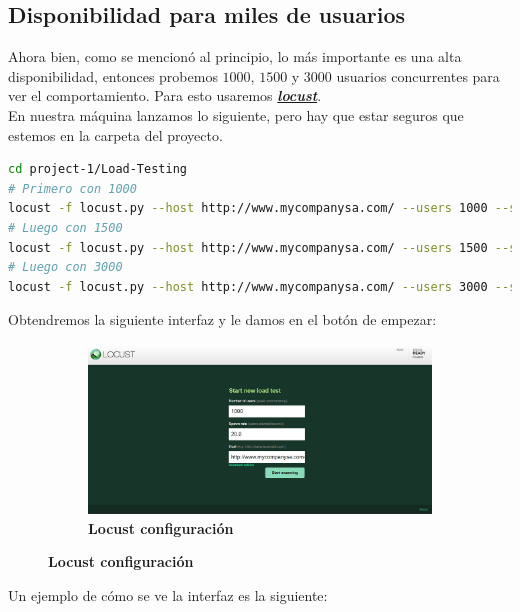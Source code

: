 \subsection{Disponibilidad para miles de usuarios}
Ahora bien, como se mencionó al principio, lo más importante es una alta
disponibilidad, entonces probemos $1000$, $1500$ y $3000$ usuarios concurrentes 
para ver el comportamiento. Para esto usaremos \textbf{\textit{\url{locust}}}.\\

En nuestra máquina lanzamos lo siguiente, pero hay que estar seguros que estemos
en la carpeta del proyecto.

\begin{lstlisting}[language=Bash]
cd project-1/Load-Testing
# Primero con 1000
locust -f locust.py --host http://www.mycompanysa.com/ --users 1000 --spawn-rate 20
# Luego con 1500
locust -f locust.py --host http://www.mycompanysa.com/ --users 1500 --spawn-rate 20
# Luego con 3000
locust -f locust.py --host http://www.mycompanysa.com/ --users 3000 --spawn-rate 20
\end{lstlisting}

Obtendremos la siguiente interfaz y le damos en el botón de empezar:

\begin{figure}[H]
    \centering
    \begin{subfigure}[b]{0.8\textwidth}
        \centering
        \includegraphics[width=\textwidth]{Figures/0. General/locust_0.png}
        \caption{\textbf{Locust configuración}}
        \label{fig: Locust config}
    \end{subfigure}
\end{figure}

Un ejemplo de cómo se ve la interfaz es la siguiente:

